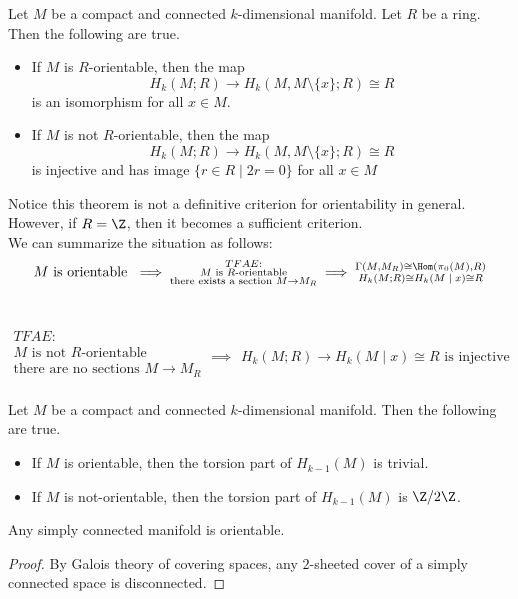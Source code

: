 \documentclass[a4paper]{article}
\begin{document}
\begin{thm}{}{} Let $M$ be a compact and connected $k$-dimensional manifold. Let $R$ be a ring. Then the following are true. 
\begin{itemize}
\item If $M$ is $R$-orientable, then the map $$H_k(M;R)\to H_k(M,M\setminus\{x\};R)\cong R$$ is an isomorphism for all $x\in M$. 
\item If $M$ is not $R$-orientable, then the map $$H_k(M;R)\to H_k(M,M\setminus\{x\};R)\cong R$$ is injective and has image $\{r\in R\;|\;2r=0\}$ for all $x\in M$
\end{itemize}
\end{thm}

Notice this theorem is not a definitive criterion for orientability in general. However, if $R=\Z$, then it becomes a sufficient criterion. \\

We can summarize the situation as follows: $$M\text{ is orientable }\implies\substack{TFAE:\\M\text{ is }R\text{-orientable}\\\text{there exists a section }M\to M_R\\}\implies\substack{\Gamma(M,M_R)\cong\Hom(\pi_0(M),R)\\H_k(M;R)\cong H_k(M\;|\;x)\cong R}$$~

$$\substack{TFAE:\\M\text{ is not }R\text{-orientable}\\\text{there are no sections }M\to M_R\\}\implies\substack{H_k(M;R)\longrightarrow H_k(M\;|\;x)\cong R\text{ is injective}}$$

\begin{crl}{}{} Let $M$ be a compact and connected $k$-dimensional manifold. Then the following are true. 
\begin{itemize}
\item If $M$ is orientable, then the torsion part of $H_{k-1}(M)$ is trivial. 
\item If $M$ is not-orientable, then the torsion part of $H_{k-1}(M)$ is $\Z/2\Z$. 
\end{itemize}
\end{crl}

\begin{crl}{}{} Any simply connected manifold is orientable. 
\begin{proof}
By Galois theory of covering spaces, any $2$-sheeted cover of a simply connected space is disconnected. 
\end{proof}
\end{crl}
\end{document}
